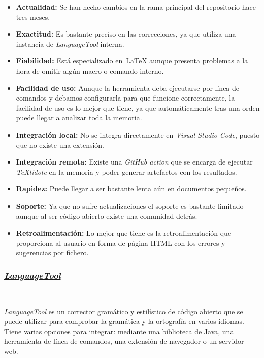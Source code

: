 \begin{itemize}
    \item[\bien] \textbf{Actualidad:}  Se han hecho cambios en la rama principal del repositorio hace tres meses.
    \item[\bien] \textbf{Exactitud:} Es bastante preciso en las correcciones, ya que utiliza una instancia de \textit{LanguageTool} interna.
    \item[\regular] \textbf{Fiabilidad:} Está especializado en~\LaTeX{} aunque presenta problemas a la hora de omitir algún macro o comando interno.
    \item[\esp] \textbf{Facilidad de uso:} Aunque la herramienta deba ejecutarse por línea de comandos y debamos configurarla para que funcione correctamente, la facilidad de uso es lo mejor que tiene, ya que automáticamente tras una orden puede llegar a analizar toda la memoria.
    \item[\mal] \textbf{Integración local:} No se integra directamente en \textit{Visual Studio Code}, puesto que no existe una extensión.
    \item[\bien] \textbf{Integración remota:} Existe una \textit{GitHub action} que se encarga de ejecutar \textit{TeXtidote} en la memoria y poder generar artefactos con los resultados. 
    \item[\regular] \textbf{Rapidez:} Puede llegar a ser bastante lenta aún en documentos pequeños.
    \item[\regular] \textbf{Soporte:} Ya que no sufre actualizaciones el soporte es bastante limitado aunque al ser código abierto existe una comunidad detrás.
    \item[\bien] \textbf{Retroalimentación:} Lo mejor que tiene es la retroalimentación que proporciona al usuario en forma de página HTML con los errores y sugerencias por fichero.
\end{itemize}

\subsubsection{\href{https://github.com/languagetool-org/languagetool}{\textit{LanguageTool}}}~\label{sec:languagetool}

\textit{LanguageTool} es un corrector gramático y estilístico de código abierto que se puede utilizar para comprobar la gramática y la ortografía en varios idiomas. Tiene varias opciones para integrar: mediante una biblioteca de Java, una herramienta de línea de comandos, una extensión de navegador o un servidor web.

